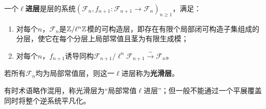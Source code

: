 一个\textbf{$\ell$进层}是层的系统$(\mathcal F_n,f_{n+1}:\mathcal F_{n+1}\to\mathcal F_n)_{n\geq1}$，满足：
\begin{enumerate}
\item 对每个$n$，$\mathcal F_n$是$\mathbb{Z}/\ell^n\mathbb{Z}$模的可构造层，即存在有限个局部闭可构造子集组成的分层，使它在每个分层上局部常值且茎为有限生成模；
\item 对每个$n$，$f_{n+1}$诱导同构$\mathcal F_{n+1}/\ell^n\mathcal F_{n+1}\xrightarrow{\sim}\mathcal F_n$。
\end{enumerate}
若所有$\mathcal F_n$均为局部常值层，则这一$\ell$进层称为\textbf{光滑层}。
\begin{note}[L11S1O1]
有时术语略作混用，称光滑层为“局部常值$\ell$进层”；但一般不能通过一个平展覆盖同时将整个逆系统平凡化。
\end{note}
